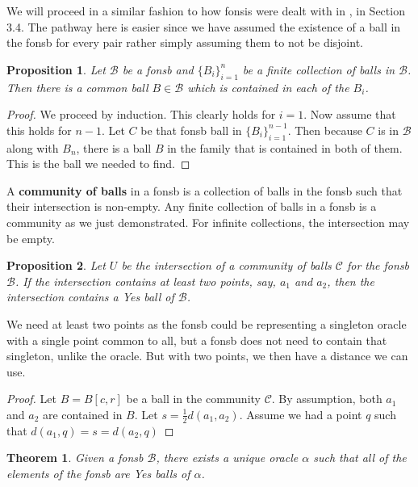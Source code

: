 \documentclass[12pt]{article}
\newtheorem{theorem}{Theorem}[section]
\newtheorem{proposition}{Proposition}[section]
\begin{document}
We will proceed in a similar fashion to how fonsis were dealt with in \cite{taylor23main}, in Section 3.4. The pathway here is easier since we have assumed the existence of a ball in the fonsb for every pair rather simply assuming them to not be disjoint. 

\begin{proposition}
    Let $\mathcal{B}$ be a fonsb and $\{B_i\}_{i=1}^n$ be a finite collection of balls in $\mathcal{B}$. Then there is a common ball $B \in \mathcal{B}$ which is contained in each of the $B_i$.
\end{proposition}

\begin{proof}
    We proceed by induction. This clearly holds for $i=1$. Now assume that this holds for $n-1$. Let $C$ be that fonsb ball in $\{B_i\}_{i=1}^{n-1}$. Then because $C$ is in $\mathcal{B}$ along with $B_n$, there is a ball $B$ in the family that is contained in both of them. This is the ball we needed to find. 
\end{proof}

A \textbf{community of balls} in a fonsb is a collection of balls in the fonsb such that their intersection is non-empty. Any finite collection of balls in a fonsb is a community as we just demonstrated. For infinite collections, the intersection may be empty. 

\begin{proposition}
Let $U$ be the intersection of a community of balls $\mathcal{C}$ for the fonsb $\mathcal{B}$. If the intersection contains at least two points, say, $a_1$ and $a_2$, then the intersection contains a Yes ball of $\mathcal{B}$.
\end{proposition}

We need at least two points as the fonsb could be representing a singleton oracle with a single point common to all, but a fonsb does not need to contain that singleton, unlike the oracle. But with two points, we then have a distance we can use. 

\begin{proof}
Let $B = B[c,r]$ be a ball in the community $\mathcal{C}$. By assumption, both $a_1$ and $a_2$ are contained in $B$. Let $s = \frac{1}{2}d(a_1, a_2)$. Assume we had a point $q$ such that $d(a_1, q)= s = d(a_2, q)$ 
\end{proof}




\begin{theorem}
    Given a fonsb $\mathcal{B}$, there exists a unique oracle $\alpha$ such that all of the elements of the fonsb are Yes balls of $\alpha$.
\end{theorem}
\end{document}

